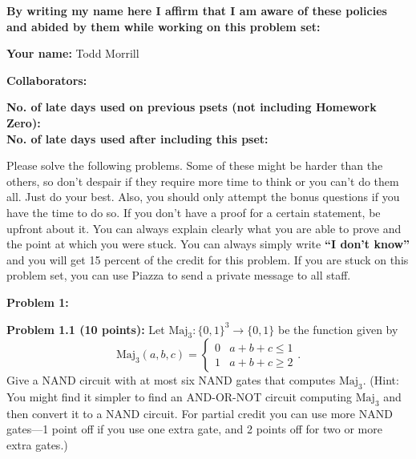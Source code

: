 \documentclass[11pt]{article}
\begin{document}
	\textbf{By writing my name here I affirm that I am aware of these policies
		and abided by them while working on this problem set:}
	
	\textbf{Your name:} Todd Morrill
	
	\textbf{Collaborators:} %
	
	\textbf{No. of late days used on previous psets (not including Homework Zero): %
}\\
	\textbf{No. of late days used after including this pset: %
}
	
	
	\newpage

{\color{red} Please solve the following problems. Some of these might be harder than
the others, so don't despair if they require more time to think or you
can't do them all. Just do your best. Also, you should only attempt the
bonus questions if you have the time to do so. If you don't have a proof
for a certain statement, be upfront about it. You can always explain
clearly what you are able to prove and the point at which you were
stuck. 
You can always simply write
\textbf{``I don't know''} and you will get 15 percent of the credit for
this problem. If you are stuck on this problem set, you can use Piazza to
send a private message to all staff.}


\newcommand{\Maj}{\mathrm{Maj}}
\newcommand{\Comp}{\mathrm{Comp}}
\textbf{Problem 1:} 

\textbf{Problem 1.1 (10 points):} Let $\Maj_3:\{0,1\}^3 \to \{0,1\}$ be the function given by 
$$\Maj_3(a,b,c) =
\begin{cases}
0 & a + b + c \le 1\\
1 & a + b + c \ge 2
\end{cases}.$$ 
Give a NAND circuit with at most six NAND gates that computes $\Maj_3$. (Hint: You might find it simpler to find an AND-OR-NOT circuit computing $\Maj_3$ and then convert it to a NAND circuit. For partial credit you can use more NAND gates---1 point off if you use one extra gate, and 2 points off for two or more extra gates.)
\end{document}
